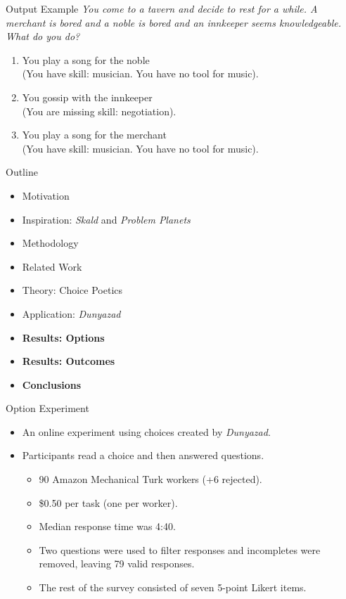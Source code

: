 \documentclass[xcolor=x11names]{beamer}
\def\dunyazad/{\textit{Dunyazad}}
\def\skald/{\textit{Skald}}
\def\problemplanets/{\textit{Problem Planets}}
\begin{document}
\begin{frame}{Output Example}
  \itshape
You come to a tavern and decide to rest for a while.
%
A merchant is bored and a noble is bored and an innkeeper seems knowledgeable.
%
What do you do?
\begin{enumerate}
\item You play a song for the noble \\
  (You have skill: musician. You have no tool for music).
\item You gossip with the innkeeper \\
  (You are missing skill: negotiation).
\item You play a song for the merchant \\
  (You have skill: musician. You have no tool for music).
\end{enumerate}
\end{frame}

\begin{frame}{Outline}
  \begin{itemize}
    \item Motivation
    \item Inspiration: \skald/ and \problemplanets/
    \item Methodology
    \item Related Work
    \item Theory: Choice Poetics
    \item Application: \dunyazad/
    \item \textbf{Results: Options}
    \item \textbf{Results: Outcomes}
    \item \textbf{Conclusions}
  \end{itemize}
\end{frame}

\begin{frame}{Option Experiment}
  \begin{itemize}\addtolength{\itemsep}{0.5\baselineskip}
    \item An online experiment using choices created by \dunyazad/.
    \item Participants read a choice and then answered questions.
    \begin{itemize}\addtolength{\itemsep}{0.5\baselineskip}
      \vspace{0.5\baselineskip}
      \item 90 Amazon Mechanical Turk workers (+6 rejected).
      \item \$0.50 per task (one per worker).
      \item Median response time was 4:40.
      \item Two questions were used to filter responses and incompletes were removed, leaving 79 valid responses.
      \item The rest of the survey consisted of seven 5-point Likert items.
    \end{itemize}
  \end{itemize}
\end{frame}
\end{document}
